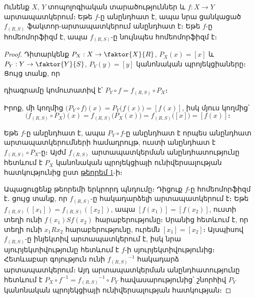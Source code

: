 \documentclass[./main.tex]{subfiles}
\begin{document}
\begin{theorem}\label{ch12thm2}
Ունենք $X$, $Y$ տոպոլոգիական տարածություններ և $f: X \to Y$ արտապատկերում։ Եթե $f$-ը անընդհատ է, ապա նրա ցանկացած $f_{(R,S)}$ ֆակտոր-արտապատկերում անընդհատ է։ Եթե $f$-ը հոմեոմորֆիզմ է, ապա $f_{(R,S)}$-ը նույնպես հոմեոմորֆիզմ է։
\end{theorem}

\begin{proof}
Դիտարկենք $P_X: X \to \faktor{X}{R}$, $P_X(x) = [x]$ և $P_Y: Y \to \faktor{Y}{S}$, $P_Y(y) = [y]$ կանոնական պրոյեկցիաները։ Ցույց տանք, որ

\begin{center}
\end{center}

\noindent դիագրամը կոմուտատիվ է՝ $P_Y \circ f = f_{(R,S)} \circ P_X$։

\par Իրոք, մի կողմից $\big(P_Y \circ f\big)(x) = P_Y\big(f(x)\big) = [f(x)]$, իսկ մյուս կողմից՝
\[
\big(f_{(R,S)} \circ P_X\big)(x) = f_{(R,S)}\big(P_X(x)\big) = f_{(R,S)}\big([x]\big) = [f(x)]։
\]

\par Եթե $f$-ը անընդհատ է, ապա $P_Y \circ f$-ը անընդհատ է որպես անընդհատ արտա\-պատ\-կերումների համադրույթ, ուստի անընդհատ է $f_{(R,S)} \circ P_X$-ը։ Այժմ $f_{(R,S)}$ արտա\-պատկերման անընդհատությունը հետևում է $P_X$ կանոնական պրոյեկցիայի ունի\-վեր\-սա\-լության հատկությունից ըստ \hyperref[ch12thm1]{թեորեմ 1}-ի։

\par Ապացուցենք թեորեմի երկրորդ պնդումը։ Դիցուք $f$-ը հոմեոմորֆիզմ է․ ցույց տանք, որ $f_{(R,S)}$-ը հակադարձելի արտապատկերում է։ Եթե $f_{(R,S)}([x_1])=f_{(R,S)}([x_2])$, ապա $[f(x_1)]=[f(x_2)]$, ուստի տեղի ունի $f(x_1)Sf(x_2)$ հարաբերությունը։ Սրանից հետևում է, որ տեղի ունի $x_1Rx_2$ հարաբերությունը, ուրեմն $[x_1]=[x_2]$։ Այսպիսով $f_{(R,S)}$-ը ինյեկտիվ արտապատկերում է, իսկ նրա սյուրյեկտիվությունը հետևում է $f$-ի սյուրյեկտիվությունից։ Հետևաբար գոյություն ունի ${f_{(R,S)}}^{-1}$ հակադարձ արտա\-պատ\-կերում։ Այդ արտապատկերման անընդհատությունը հետևում է $P_X \circ f^{-1} = {f_{(R,S)}}^{-1} \circ P_Y$ հավասարությունից՝ շնորհիվ $P_Y$ կանոնական պրոյեկցիայի ունի\-վեր\-սա\-լու\-թյան հատկության։
\end{proof}
\end{document}
